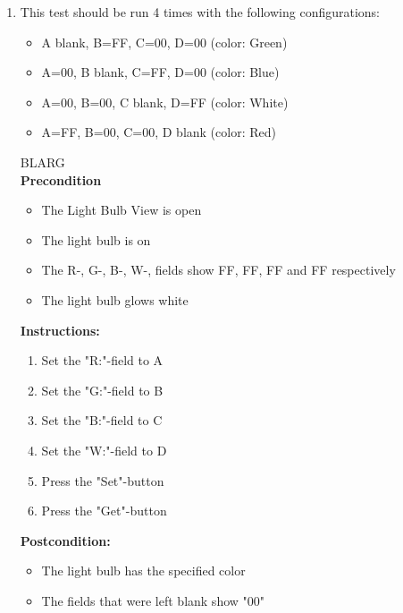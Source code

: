 \documentclass[a4paper]{article}
\newlength{\testlabellength}
\newenvironment{testlist}{\begin{enumerate}[label=\bfseries Instruction \thesubsection.\arabic* , labelindent=0pt, labelwidth=\testlabellength , leftmargin=2cm]}{\end{enumerate}}
\newenvironment{precondition}{
{\color{white}BLARG}\\ 
\textbf{Precondition}
\begin{itemize}[labelindent=0cm, labelwidth=2cm , leftmargin=1cm]
}
{\end{itemize}}
\newenvironment{instruction}{
\textbf{Instructions:}
\begin{enumerate}[label=\bfseries  \arabic*., labelindent=0cm, labelwidth=2cm , leftmargin=1cm]
}
{\end{enumerate}}
\newenvironment{postcondition}{
\textbf{Postcondition:}
\begin{itemize}[labelindent=0cm, labelwidth=2cm , leftmargin=1cm]
}
{\end{itemize}}
\begin{document}
\begin{appendices}
\begin{testlist}

	\item This test should be run 4 times with the following configurations:
		\begin{itemize}
			\item A blank, B=FF, C=00, D=00 (color: Green)
			\item A=00, B blank, C=FF, D=00 (color: Blue)
			\item A=00, B=00, C blank, D=FF (color: White)
			\item A=FF, B=00, C=00, D blank (color: Red)
		\end{itemize}
		\begin{precondition}
			\item The Light Bulb View is open
			\item The light bulb is on
			\item The R-, G-, B-, W-, fields show FF, FF, FF and FF respectively
			\item The light bulb glows white
		\end{precondition}
		\begin{instruction}
			\item Set the "R:"-field to A
			\item Set the "G:"-field to B
			\item Set the "B:"-field to C
			\item Set the "W:"-field to D
			\item Press the "Set"-button
			\item Press the "Get"-button
		\end{instruction}
		\begin{postcondition}
			\item The light bulb has the specified color
			\item The fields that were left blank show "00"
		\end{postcondition}
		


\end{testlist}
\end{appendices}
\end{document}
